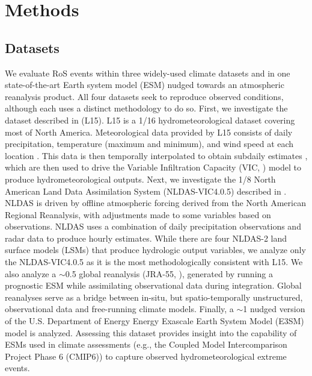 \documentclass[nhess, manuscript]{copernicus}
\begin{document}

\section{Methods}

\subsection{Datasets}

We evaluate RoS events within three widely-used climate datasets and in one state-of-the-art Earth system model (ESM) nudged towards an atmospheric reanalysis product.
All four datasets seek to reproduce observed conditions, although each uses a distinct methodology to do so.
First, we investigate the dataset described in \citet{livneh2015spatially} (L15).
L15 is a 1/16\degree{} hydrometeorological dataset covering most of North America.
Meteorological data provided by L15 consists of daily precipitation, temperature (maximum and minimum), and wind speed at each location \citep{henn2018an}.
This data is then temporally interpolated to obtain subdaily estimates \citep{bohn2013global}, which are then used to drive the Variable Infiltration Capacity (VIC, \citet{liang1994simple}) model to produce hydrometeorological outputs.
Next, we investigate the 1/8\degree{} North American Land Data Assimilation System (NLDAS-VIC4.0.5)  described in \citet{xia2012continental1}.
NLDAS is driven by offline atmospheric forcing derived from the North American Regional Reanalysis, with adjustments made to some variables based on observations.
NLDAS uses a combination of daily precipitation observations and radar data to produce hourly estimates.
While there are four NLDAS-2 land surface models (LSMs) that produce hydrologic output variables, we analyze only the NLDAS-VIC4.0.5 as it is the most methodologically consistent with L15.
We also analyze a $\sim$0.5\degree{} global reanalysis (JRA-55, \citet{kobayashi2015jra55}), generated by running a prognostic ESM while assimilating observational data during integration.
Global reanalyses serve as a bridge between in-situ, but spatio-temporally unstructured, observational data and free-running climate models.
Finally, a $\sim$1\degree{} nudged version of the U.S. Department of Energy Energy Exascale Earth System Model (E3SM) model is analyzed. Assessing this dataset provides insight into the capability of ESMs used in climate assessments (e.g., the Coupled Model Intercomparison Project Phase 6 (CMIP6)) to capture observed hydrometeorological extreme events.
\end{document}
